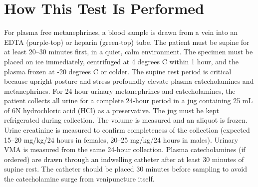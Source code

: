 \section*{How This Test Is Performed}
For plasma free metanephrines, a blood sample is drawn from a vein into an EDTA (purple-top) or heparin (green-top) tube. The patient must be supine for at least 20--30 minutes first, in a quiet, calm environment. The specimen must be placed on ice immediately, centrifuged at 4 degrees C within 1 hour, and the plasma frozen at -20 degrees C or colder. The supine rest period is critical because upright posture and stress profoundly elevate plasma catecholamines and metanephrines. For 24-hour urinary metanephrines and catecholamines, the patient collects all urine for a complete 24-hour period in a jug containing 25 mL of 6N hydrochloric acid (HCl) as a preservative. The jug must be kept refrigerated during collection. The volume is measured and an aliquot is frozen. Urine creatinine is measured to confirm completeness of the collection (expected 15--20 mg/kg/24 hours in females, 20--25 mg/kg/24 hours in males). Urinary VMA is measured from the same 24-hour collection. Plasma catecholamines (if ordered) are drawn through an indwelling catheter after at least 30 minutes of supine rest. The catheter should be placed 30 minutes before sampling to avoid the catecholamine surge from venipuncture itself.

